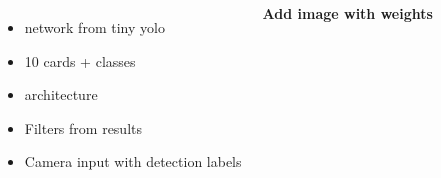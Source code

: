 \documentclass[25pt, a0paper, landscape]{tikzposter}
\begin{document}
\begin{columns}
{\begin{minipage}{\columnwidth}
\begin{minipage}{500 pt}
\begin{itemize}
					        		\item network from tiny yolo
					        		
					        		\item 10 cards + classes
					        		
					        		\item architecture
					        		
					        		
					        		\item Filters from results
					        		
					        		\item Camera input with detection labels
					        	\end{itemize}
			    		  	\end{minipage}
			\end{minipage}
			\bfseries Add image with weights
        }
\end{columns}
\end{document}
